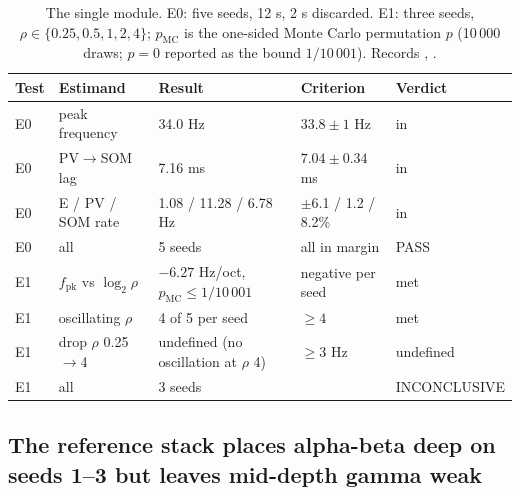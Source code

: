 \begin{table}[tbp]
\centering
\small
\begin{tabular}{lllll}
\toprule
Test & Estimand & Result & Criterion & Verdict \\
\midrule
E0 & peak frequency & 34.0 Hz & $33.8 \pm 1$ Hz & in \\
E0 & PV$\to$SOM lag & 7.16 ms & $7.04 \pm 0.34$ ms & in \\
E0 & E / PV / SOM rate & 1.08 / 11.28 / 6.78 Hz & $\pm$6.1 / 1.2 / 8.2\% & in \\
E0 & all & 5 seeds & all in margin & PASS \\
\addlinespace
E1 & $f_\text{pk}$ vs $\log_2\rho$ & $-6.27$ Hz/oct, $p_\text{MC}\leq1/10\,001$ & negative per seed & met \\
E1 & oscillating $\rho$ & 4 of 5 per seed & $\geq 4$ & met \\
E1 & drop $\rho$ 0.25$\to$4 & undefined (no oscillation at $\rho$ 4) & $\geq 3$ Hz & undefined \\
E1 & all & 3 seeds & & INCONCLUSIVE \\
\bottomrule
\end{tabular}
\caption{The single module. E0: five seeds, 12 s, 2 s discarded. E1: three seeds, $\rho \in \{0.25, 0.5, 1, 2, 4\}$;
$p_\text{MC}$ is the one-sided Monte Carlo permutation $p$ (10\,000 draws; $p = 0$ reported as the bound $1/10\,001$).
Records , .}
\label{tab:e0e1}
\end{table}

\subsection{The reference stack places alpha-beta deep on seeds 1--3 but leaves mid-depth gamma weak}

